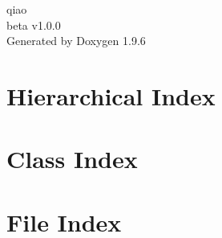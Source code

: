 \documentclass[twoside]{book}
\newcommand{\+}{\discretionary{\mbox{\scriptsize$\hookleftarrow$}}{}{}}
\newcommand{\clearemptydoublepage}{%
    \newpage{\pagestyle{empty}\cleardoublepage}%
  }
\begin{document}
  \raggedbottom
    \hypersetup{pageanchor=false,
                bookmarksnumbered=true,
                pdfencoding=unicode
               }
  \begin{titlepage}
  \vspace*{7cm}
  \begin{center}%
  {\Large qiao}\\
  [1ex]\large beta v1.\+0.\+0 \\
  \vspace*{1cm}
  {\large Generated by Doxygen 1.9.6}\\
  \end{center}
  \end{titlepage}
  \clearemptydoublepage
  \tableofcontents
  \clearemptydoublepage
  \hypersetup{pageanchor=true}
\chapter{Hierarchical Index}

\chapter{Class Index}

\chapter{File Index}

\end{document}
